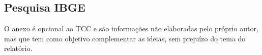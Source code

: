 \documentclass[
	12pt,				%
	openright,			%
	oneside,			%
	a4paper,			%
	chapter=TITLE,		%
	section=TITLE,		%
	brazil				%
	]{abntex2}
\begin{document}
\begin{anexosenv}

\chapter{Pesquisa IBGE}
O anexo é opcional ao TCC e são informações não elaboradas pelo próprio autor, mas que tem como objetivo complementar as ideias, sem prejuízo do tema do relatório.

\end{anexosenv}

\label{nropaginas}


\printindex
\end{document}
